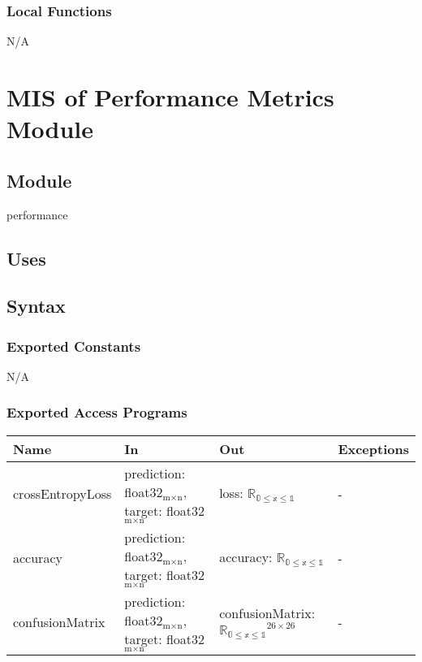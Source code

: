 \documentclass[12pt, titlepage]{article}
\begin{document}
\subsubsection{Local Functions}

N/A

\section{MIS of Performance Metrics Module} \label{MPerformance}

\subsection{Module}

performance

\subsection{Uses}


\subsection{Syntax}

\subsubsection{Exported Constants}

N/A

\subsubsection{Exported Access Programs}

\begin{center}
\begin{tabular}{p{4cm} p{4cm} p{4cm} p{2cm}}
\hline
\textbf{Name} & \textbf{In} & \textbf{Out} & \textbf{Exceptions} \\
\hline
crossEntropyLoss & prediction: float32$_{\text{m} \times \text{n}}$, target: float32$_{\text{m} \times \text{n}}$ & loss: $\mathbb{R_{\text{0} \leq \text{x} \leq \text{1}}}$ & - \\
accuracy & prediction: float32$_{\text{m} \times \text{n}}$, target: float32$_{\text{m} \times \text{n}}$ & accuracy: $\mathbb{R_{\text{0} \leq \text{x} \leq \text{1}}}$ & - \\
confusionMatrix & prediction: float32$_{\text{m} \times \text{n}}$, target: float32$_{\text{m} \times \text{n}}$ & confusionMatrix: $\mathbb{R_{\text{0} \leq \text{x} \leq \text{1}}}^{26 \times 26}$ & - \\
\hline
\end{tabular}
\end{center}
\end{document}

